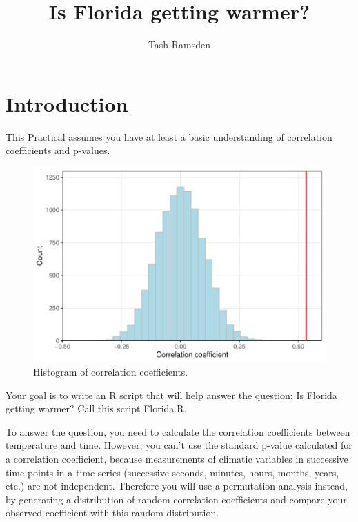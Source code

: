 \documentclass[11pt]{article}
\title{Is Florida getting warmer?}
\author{Tash Ramsden}
\date{}
\begin{document}
    \maketitle
    
    \section{Introduction}

    This Practical assumes you have at least a basic understanding of correlation coefficients and p-values.

    \begin{figure}[H]
        \centering
            \includegraphics[width=0.7\linewidth]{coefs_hist.pdf}
            \caption{Histogram of correlation coefficients.}
            \label{fig:coefs_hist}
    \end{figure}

    Your goal is to write an R script that will help answer the question: Is Florida getting warmer? Call this script Florida.R.

    To answer the question, you need to calculate the correlation coefficients between temperature and time. However, you can’t use the standard p-value calculated for a correlation coefficient, because measurements of climatic variables in successive time-points in a time series (successive seconds, minutes, hours, months, years, etc.) are not independent. Therefore you will use a permutation analysis instead, by generating a distribution of random correlation coefficients and compare your observed coefficient with this random distribution.
    
\end{document}
